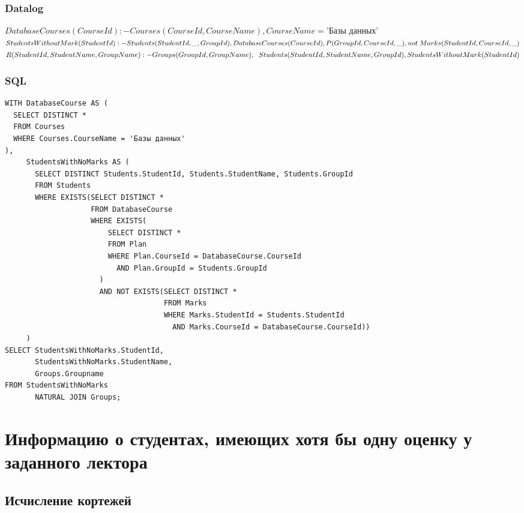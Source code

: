 \documentclass{article}
\begin{document}
\subsubsection{Datalog}
$
DatabaseCourses(CourseId) :- Courses(CourseId, CourseName), CourseName = \text{'Базы данных'}
$
\newline
\newline
$
StudentsWithoutMark(StudentId) :- Students(StudentId, \_, GroupId), DatabaseCourses(CourseId),\\ P(GroupId, CourseId, \_), not \; Marks(StudentId, CourseId, \_)
$
\newline
\newline
$
R(StudentId, StudentName, GroupName) :- Groups(GroupId, GroupName),\\ \; \; Students(StudentId, StudentName, GroupId),  StudentsWithoutMark(StudentId)
$

\subsubsection{SQL}
\begin{verbatim}
WITH DatabaseCourse AS (
  SELECT DISTINCT *
  FROM Courses
  WHERE Courses.CourseName = 'Базы данных'
),
     StudentsWithNoMarks AS (
       SELECT DISTINCT Students.StudentId, Students.StudentName, Students.GroupId
       FROM Students
       WHERE EXISTS(SELECT DISTINCT *
                    FROM DatabaseCourse
                    WHERE EXISTS(
                        SELECT DISTINCT *
                        FROM Plan
                        WHERE Plan.CourseId = DatabaseCourse.CourseId
                          AND Plan.GroupId = Students.GroupId
                      )
                      AND NOT EXISTS(SELECT DISTINCT *
                                     FROM Marks
                                     WHERE Marks.StudentId = Students.StudentId
                                       AND Marks.CourseId = DatabaseCourse.CourseId))
     )
SELECT StudentsWithNoMarks.StudentId,
       StudentsWithNoMarks.StudentName,
       Groups.Groupname
FROM StudentsWithNoMarks
       NATURAL JOIN Groups;
\end{verbatim}

\section{Информацию о студентах, имеющих хотя бы одну оценку у заданного лектора}

\subsection{Исчисление кортежей}
\end{document}
